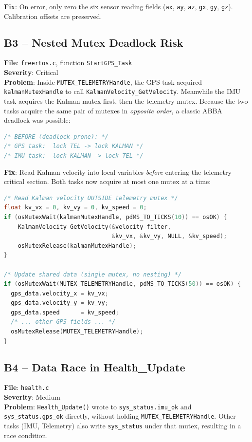 \documentclass[11pt,a4paper]{article}
\begin{document}
\textbf{Fix}: On error, only zero the six sensor reading fields (\texttt{ax}, \texttt{ay},
\texttt{az}, \texttt{gx}, \texttt{gy}, \texttt{gz}).  Calibration offsets are preserved.

\subsection{B3 -- Nested Mutex Deadlock Risk}

\textbf{File}: \texttt{freertos.c}, function \texttt{StartGPS\_Task} \\
\textbf{Severity}: Critical \\
\textbf{Problem}: Inside \texttt{MUTEX\_TELEMETRYHandle}, the GPS task acquired
\texttt{kalmanMutexHandle} to call \texttt{KalmanVelocity\_GetVelocity}.  Meanwhile the
IMU task acquires the Kalman mutex first, then the telemetry mutex.  Because the two
tasks acquire the same pair of mutexes in \emph{opposite order}, a classic ABBA deadlock
was possible:

\begin{lstlisting}[language=C]
/* BEFORE (deadlock-prone): */
/* GPS task:  lock TEL -> lock KALMAN */
/* IMU task:  lock KALMAN -> lock TEL */
\end{lstlisting}

\textbf{Fix}: Read Kalman velocity into local variables \emph{before} entering the
telemetry critical section.  Both tasks now acquire at most one mutex at a time:

\begin{lstlisting}[language=C]
/* Read Kalman velocity OUTSIDE telemetry mutex */
float kv_vx = 0, kv_vy = 0, kv_speed = 0;
if (osMutexWait(kalmanMutexHandle, pdMS_TO_TICKS(10)) == osOK) {
    KalmanVelocity_GetVelocity(&velocity_filter,
                               &kv_vx, &kv_vy, NULL, &kv_speed);
    osMutexRelease(kalmanMutexHandle);
}

/* Update shared data (single mutex, no nesting) */
if (osMutexWait(MUTEX_TELEMETRYHandle, pdMS_TO_TICKS(50)) == osOK) {
  gps_data.velocity_x = kv_vx;
  gps_data.velocity_y = kv_vy;
  gps_data.speed      = kv_speed;
  /* ... other GPS fields ... */
  osMutexRelease(MUTEX_TELEMETRYHandle);
}
\end{lstlisting}

\subsection{B4 -- Data Race in Health\_Update}

\textbf{File}: \texttt{health.c} \\
\textbf{Severity}: Medium \\
\textbf{Problem}: \texttt{Health\_Update()} wrote to \texttt{sys\_status.imu\_ok}
and \texttt{sys\_status.gps\_ok} directly, without holding
\texttt{MUTEX\_TELEMETRYHandle}.  Other tasks (IMU, Telemetry) also write
\texttt{sys\_status} under that mutex, resulting in a race condition.
\end{document}
